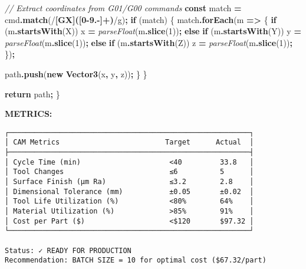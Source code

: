\documentclass[
]{article}
\newenvironment{Shaded}{\begin{snugshade}}{\end{snugshade}}
\newcommand{\CommentTok}[1]{\textcolor[rgb]{0.56,0.35,0.01}{\textit{#1}}}
\newcommand{\ControlFlowTok}[1]{\textcolor[rgb]{0.13,0.29,0.53}{\textbf{#1}}}
\newcommand{\DecValTok}[1]{\textcolor[rgb]{0.00,0.00,0.81}{#1}}
\newcommand{\FunctionTok}[1]{\textcolor[rgb]{0.13,0.29,0.53}{\textbf{#1}}}
\newcommand{\KeywordTok}[1]{\textcolor[rgb]{0.13,0.29,0.53}{\textbf{#1}}}
\newcommand{\NormalTok}[1]{#1}
\newcommand{\OperatorTok}[1]{\textcolor[rgb]{0.81,0.36,0.00}{\textbf{#1}}}
\newcommand{\PreprocessorTok}[1]{\textcolor[rgb]{0.56,0.35,0.01}{\textit{#1}}}
\newcommand{\SpecialCharTok}[1]{\textcolor[rgb]{0.81,0.36,0.00}{\textbf{#1}}}
\newcommand{\SpecialStringTok}[1]{\textcolor[rgb]{0.31,0.60,0.02}{#1}}
\newcommand{\StringTok}[1]{\textcolor[rgb]{0.31,0.60,0.02}{#1}}
\begin{document}
\begin{Shaded}
\begin{Highlighting}[]
    \CommentTok{// Extract coordinates from G01/G00 commands}
    \KeywordTok{const}\NormalTok{ match }\OperatorTok{=}\NormalTok{ cmd}\OperatorTok{.}\FunctionTok{match}\NormalTok{(}\SpecialStringTok{/}\SpecialCharTok{[GX]([0{-}9.{-}]+)}\SpecialStringTok{/g}\NormalTok{)}\OperatorTok{;}
    \ControlFlowTok{if}\NormalTok{ (match) \{}
\NormalTok{      match}\OperatorTok{.}\FunctionTok{forEach}\NormalTok{(m }\KeywordTok{=\textgreater{}}\NormalTok{ \{}
        \ControlFlowTok{if}\NormalTok{ (m}\OperatorTok{.}\FunctionTok{startsWith}\NormalTok{(}\StringTok{\textquotesingle{}X\textquotesingle{}}\NormalTok{)) x }\OperatorTok{=} \PreprocessorTok{parseFloat}\NormalTok{(m}\OperatorTok{.}\FunctionTok{slice}\NormalTok{(}\DecValTok{1}\NormalTok{))}\OperatorTok{;}
        \ControlFlowTok{else} \ControlFlowTok{if}\NormalTok{ (m}\OperatorTok{.}\FunctionTok{startsWith}\NormalTok{(}\StringTok{\textquotesingle{}Y\textquotesingle{}}\NormalTok{)) y }\OperatorTok{=} \PreprocessorTok{parseFloat}\NormalTok{(m}\OperatorTok{.}\FunctionTok{slice}\NormalTok{(}\DecValTok{1}\NormalTok{))}\OperatorTok{;}
        \ControlFlowTok{else} \ControlFlowTok{if}\NormalTok{ (m}\OperatorTok{.}\FunctionTok{startsWith}\NormalTok{(}\StringTok{\textquotesingle{}Z\textquotesingle{}}\NormalTok{)) z }\OperatorTok{=} \PreprocessorTok{parseFloat}\NormalTok{(m}\OperatorTok{.}\FunctionTok{slice}\NormalTok{(}\DecValTok{1}\NormalTok{))}\OperatorTok{;}
\NormalTok{      \})}\OperatorTok{;}

\NormalTok{      path}\OperatorTok{.}\FunctionTok{push}\NormalTok{(}\KeywordTok{new} \FunctionTok{Vector3}\NormalTok{(x}\OperatorTok{,}\NormalTok{ y}\OperatorTok{,}\NormalTok{ z))}\OperatorTok{;}
\NormalTok{    \}}
\NormalTok{  \}}

  \ControlFlowTok{return}\NormalTok{ path}\OperatorTok{;}
\NormalTok{\}}
\end{Highlighting}
\end{Shaded}

\textbf{METRICS:}

\begin{verbatim}
┌─────────────────────────────────────────────────────────┐
│ CAM Metrics                         Target      Actual  │
├─────────────────────────────────────────────────────────┤
│ Cycle Time (min)                     <40         33.8   │
│ Tool Changes                         ≤6          5      │
│ Surface Finish (μm Ra)               ≤3.2        2.8    │
│ Dimensional Tolerance (mm)           ±0.05       ±0.02  │
│ Tool Life Utilization (%)            <80%        64%    │
│ Material Utilization (%)             >85%        91%    │
│ Cost per Part ($)                    <$120       $97.32 │
└─────────────────────────────────────────────────────────┘

Status: ✓ READY FOR PRODUCTION
Recommendation: BATCH SIZE = 10 for optimal cost ($67.32/part)
\end{verbatim}
\end{document}
